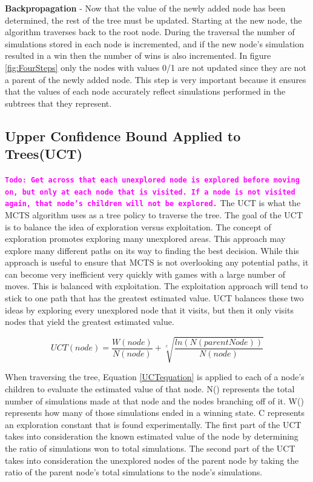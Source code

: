 \documentclass{sig-alternate}
\newcommand{\comment}[1]{{\bf \tt  {#1}}}
\newcommand{\todo}[1]{\textcolor{magenta}{\comment{Todo: {#1}}}}
\begin{document}
\textbf{Backpropagation} - Now that the value of the newly added node has been determined, the rest of the tree must be updated. Starting at the new node, the algorithm traverses back to the root node. During the traversal the number of simulations stored in each node is incremented, and if the new node's simulation resulted in a win then the number of wins is also incremented. In figure \ref{fig:FourSteps} only the nodes with values 0/1 are not updated since they are not a parent of the newly added node. This step is very important because it ensures that the values of each node accurately reflect simulations performed in the subtrees that they represent.

\subsection{Upper Confidence Bound Applied to Trees(UCT)}
\todo{Get across that each unexplored node is explored before moving on, but only at each node that is visited. If a node is not visited again, that node's children will not be explored.}
The UCT is what the MCTS algorithm uses as a tree policy to traverse the tree. The goal of the UCT is to balance the idea of exploration versus exploitation. The concept of exploration promotes exploring many unexplored areas. This approach may explore many different paths on its way to finding the best decision. While this approach is useful to ensure that MCTS is not overlooking any potential paths, it can become very inefficient very quickly with games with a large number of moves. This is balanced with exploitation. The exploitation approach will tend to stick to one path that has the greatest estimated value. UCT balances these two ideas by exploring every unexplored node that it visits, but then it only visits nodes that yield the greatest estimated value.

 \begin{equation}
 \label{UCTequation}
 UCT(node) = \frac{W(node)}{N(node)} + \sqrt[c]{\frac{ln(N(parentNode))}{N(node)}}
 \end{equation}

When traversing the tree, Equation \ref{UCTequation} is applied to each of a node's children to evaluate the estimated value of that node\cite{ActionSelection}. N() represents the total number of simulations made at that node and the nodes branching off of it. W() represents how many of those simulations ended in a winning state. C represents an exploration constant that is found experimentally. The first part of the UCT takes into consideration the known estimated value of the node by determining the ratio of simulations won to total simulations. The second part of the UCT takes into consideration the unexplored nodes of the parent node by taking the ratio of the parent node's total simulations to the node's simulations.
\end{document}

